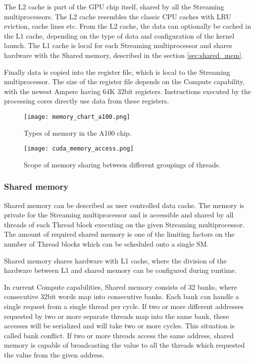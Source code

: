 


The L2 cache is part of the GPU chip itself, shared by all the Streaming multiprocessors. The L2 cache resembles the classic CPU caches with LRU eviction, cache lines etc. From the L2 cache, the data can optionally be cached in the L1 cache, depending on the type of data and configuration of the kernel launch. The L1 cache is local for each Streaming multiprocessor and shares hardware with the Shared memory, described in the section \ref{sec:shared_mem}. 

Finally data is copied into the register file, which is local to the Streaming multiprocessor. The size of the register file depends on the Compute capability, with the newest Ampere having 64K 32bit registers. Instructions executed by the processing cores directly use data from these registers.



\begin{figure}[h]
	\centering
	\texttt{[image: memory\_chart\_a100.png]}
	\caption{Types of memory in the A100 chip.}
	\label{fig:memory_chart}
\end{figure}

\begin{figure}[h]
	\centering
	\texttt{[image: cuda\_memory\_access.png]}
	\caption{Scope of memory sharing between different groupings of threads.}
	\label{fig:memory_sharing}
\end{figure}

\subsubsection{Shared memory}

Shared memory can be described as user controlled data cache. The memory is private for the Streaming multiprocessor and is accessible and shared by all threads of each Thread block executing on the given Streaming multiprocessor. The amount of required shared memory is one of the limiting factors on the number of Thread blocks which can be scheduled onto a single SM.

Shared memory shares hardware with L1 cache, where the division of the hardware between L1 and shared memory can be configured during runtime.

In current Compute capabilities, Shared memory consists of 32 banks, where consecutive 32bit words map into consecutive banks. Each bank can handle a single request from a single thread per cycle. If two or more different addresses requested by two or more separate threads map into the same bank, these accesses will be serialized and will take two or more cycles. This situation is called bank conflict. If two or more threads access the same address, shared memory is capable of broadcasting the value to all the threads which requested the value from the given address.

